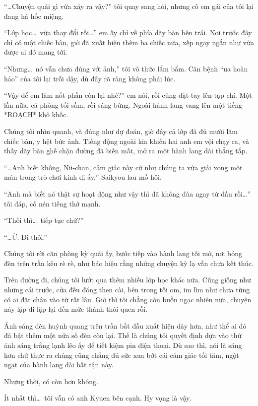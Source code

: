 \documentclass[../main.tex]{subfiles}
\begin{document}
``\dots Chuyện quái gì vừa xảy ra vậy?'' tôi quay sang hỏi, nhưng cô em gái của tôi lại đang há hốc miệng.

``Lớp học\dots\ vừa thay đổi rồi\dots'' em ấy chỉ về phía dãy bàn bên trái. Nơi trước đây chỉ có một chiếc bàn, giờ đã xuất hiện thêm ba chiếc nữa, xếp ngay ngắn như vừa được ai đó mang tới.

``Nhưng\dots\ nó vẫn chưa đúng với ảnh,'' tôi vô thức lẩm bẩm. Căn bệnh ``ưa hoàn hảo'' của tôi lại trỗi dậy, dù đây rõ ràng không phải lúc.

``Vậy để em làm nốt phần còn lại nhé?'' em nói, rồi cũng đặt tay lên tạp chí. Một lần nữa, cả phòng tối sầm, rồi sáng bừng. Ngoài hành lang vang lên một tiếng *ROẠCH* khô khốc.

Chúng tôi nhìn quanh, và đúng như dự đoán, giờ đây cả lớp đã đủ mười lăm chiếc bàn, y hệt bức ảnh. Tiếng động ngoài kia khiến hai anh em vội chạy ra, và thấy dãy bàn ghế chặn đường đã biến mất, mở ra một hành lang dài thẳng tắp.

``\dots Anh biết không, Nii-chan, cảm giác này cứ như chúng ta vừa giải xong một màn trong trò chơi kinh dị ấy,'' Saikyou lau mồ hôi.

``Anh mà biết nó thật sự hoạt động như vậy thì đã không đùa ngay từ đầu rồi\dots'' tôi đáp, cố nén tiếng thở mạnh.

``Thôi thì\dots\ tiếp tục chứ?''

``\dots Ừ. Đi thôi.''

Chúng tôi rời căn phòng kỳ quái ấy, bước tiếp vào hành lang tối mờ, nơi bóng đèn trên trần kêu rè rè, như báo hiệu rằng những chuyện kỳ lạ vẫn chưa kết thúc.


Trên đường đi, chúng tôi lướt qua thêm nhiều lớp học khác nữa. Cũng giống như những cái trước, cửa đều đóng then cài, bên trong tối om, im lìm như chưa từng có ai đặt chân vào từ rất lâu. Giờ thì tôi chẳng còn buồn ngạc nhiên nữa, chuyện này lặp đi lặp lại đến mức thành thói quen rồi.

Ánh sáng đèn huỳnh quang trên trần bắt đầu xuất hiện dày hơn, như thể ai đó đã bật thêm một nửa số đèn còn lại. Thế là chúng tôi quyết định dựa vào thứ ánh sáng trắng lạnh lẽo ấy để tiết kiệm pin điện thoại. Dù sao thì, nói là sáng hơn chứ thực ra chúng cũng chẳng đủ sức xua bớt cái cảm giác tối tăm, ngột ngạt của hành lang dài bất tận này.

Nhưng thôi, có còn hơn không.

Ít nhất thì\dots\ tôi vẫn có anh Kyuen bên cạnh. Hy vọng là vậy.
\end{document}
